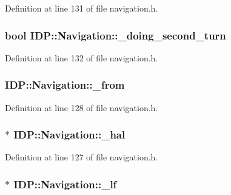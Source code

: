 Definition at line 131 of file navigation.h.

\hypertarget{classIDP_1_1Navigation_aa0bdef936676bd9ba41ec24994c4adc8}{
\subsubsection[{\_\-doing\_\-second\_\-turn}]{\setlength{\rightskip}{0pt plus 5cm}bool {\bf IDP::Navigation::\_\-doing\_\-second\_\-turn}}}
\label{classIDP_1_1Navigation_aa0bdef936676bd9ba41ec24994c4adc8}


Definition at line 132 of file navigation.h.

\hypertarget{classIDP_1_1Navigation_a7ce2cbd9199af73b36d4e887282a38e6}{
\subsubsection[{\_\-from}]{ {\bf IDP::Navigation::\_\-from}}}
\label{classIDP_1_1Navigation_a7ce2cbd9199af73b36d4e887282a38e6}


Definition at line 128 of file navigation.h.

\hypertarget{classIDP_1_1Navigation_a640c36341bdf1e2d4ef194ad3aac9773}{
\subsubsection[{\_\-hal}]{$\ast$ {\bf IDP::Navigation::\_\-hal}}}
\label{classIDP_1_1Navigation_a640c36341bdf1e2d4ef194ad3aac9773}


Definition at line 127 of file navigation.h.

\hypertarget{classIDP_1_1Navigation_a61d775069513302fa6b23c64da7a6ec4}{
\subsubsection[{\_\-lf}]{$\ast$ {\bf IDP::Navigation::\_\-lf}}}
\label{classIDP_1_1Navigation_a61d775069513302fa6b23c64da7a6ec4}


